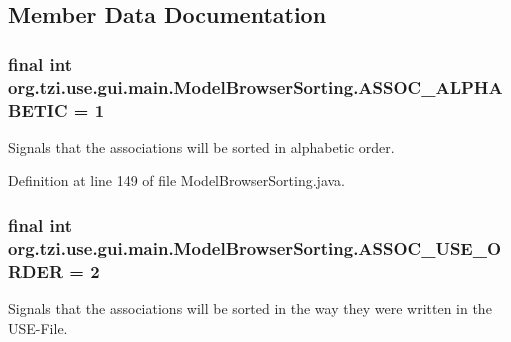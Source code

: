 \subsection{Member Data Documentation}
\hypertarget{classorg_1_1tzi_1_1use_1_1gui_1_1main_1_1_model_browser_sorting_ac937508fefc10d9fa8e38989798f6716}{
\subsubsection[{A\-S\-S\-O\-C\-\_\-\-A\-L\-P\-H\-A\-B\-E\-T\-I\-C}]{\setlength{\rightskip}{0pt plus 5cm}final int org.\-tzi.\-use.\-gui.\-main.\-Model\-Browser\-Sorting.\-A\-S\-S\-O\-C\-\_\-\-A\-L\-P\-H\-A\-B\-E\-T\-I\-C = 1\hspace{0.3cm}{\ttfamily [static]}}}\label{classorg_1_1tzi_1_1use_1_1gui_1_1main_1_1_model_browser_sorting_ac937508fefc10d9fa8e38989798f6716}
Signals that the associations will be sorted in alphabetic order. 

Definition at line 149 of file Model\-Browser\-Sorting.\-java.

\hypertarget{classorg_1_1tzi_1_1use_1_1gui_1_1main_1_1_model_browser_sorting_aa473fe8f3e73f0808e376545ef463581}{
\subsubsection[{A\-S\-S\-O\-C\-\_\-\-U\-S\-E\-\_\-\-O\-R\-D\-E\-R}]{\setlength{\rightskip}{0pt plus 5cm}final int org.\-tzi.\-use.\-gui.\-main.\-Model\-Browser\-Sorting.\-A\-S\-S\-O\-C\-\_\-\-U\-S\-E\-\_\-\-O\-R\-D\-E\-R = 2\hspace{0.3cm}{\ttfamily [static]}}}\label{classorg_1_1tzi_1_1use_1_1gui_1_1main_1_1_model_browser_sorting_aa473fe8f3e73f0808e376545ef463581}
Signals that the associations will be sorted in the way they were written in the U\-S\-E-\/\-File. 

